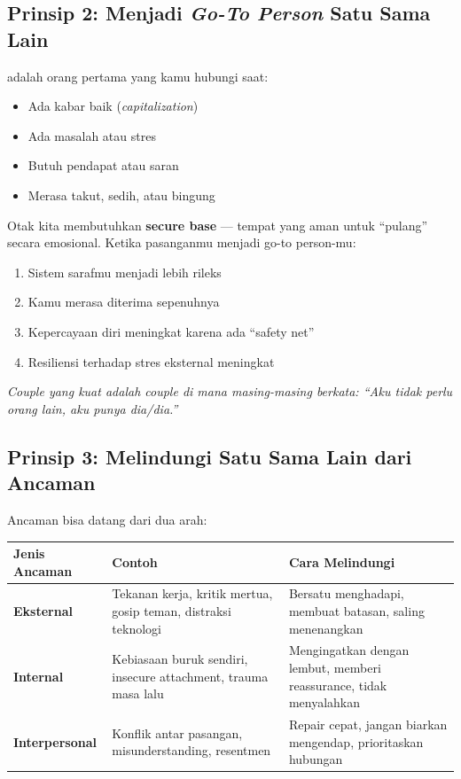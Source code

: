 \subsection{Prinsip 2: Menjadi \textit{Go-To Person} Satu Sama Lain}

 adalah orang pertama yang kamu hubungi saat:
\begin{itemize}
    \item Ada kabar baik (\textit{capitalization})
    \item Ada masalah atau stres
    \item Butuh pendapat atau saran
    \item Merasa takut, sedih, atau bingung
\end{itemize}

\begin{praktikbox}
Otak kita membutuhkan \textbf{secure base} --- tempat yang aman untuk ``pulang'' secara emosional. Ketika pasanganmu menjadi go-to person-mu:
\begin{enumerate}
    \item Sistem sarafmu menjadi lebih rileks
    \item Kamu merasa diterima sepenuhnya
    \item Kepercayaan diri meningkat karena ada ``safety net''
    \item Resiliensi terhadap stres eksternal meningkat
\end{enumerate}

\textit{Couple yang kuat adalah couple di mana masing-masing berkata: ``Aku tidak perlu orang lain, aku punya dia/dia.''}
\end{praktikbox}

\subsection{Prinsip 3: Melindungi Satu Sama Lain dari Ancaman}

Ancaman bisa datang dari dua arah:

\begin{center}
\renewcommand{\arraystretch}{1.6}
\begin{tabular}{|>{\raggedright}p{3cm}|>{\raggedright}p{5.5cm}|>{\raggedright\arraybackslash}p{5.5cm}|}
\hline
\rowcolor{primary!20}
\textbf{Jenis Ancaman} & \textbf{Contoh} & \textbf{Cara Melindungi} \\
\hline
\textbf{Eksternal} & Tekanan kerja, kritik mertua, gosip teman, distraksi teknologi & Bersatu menghadapi, membuat batasan, saling menenangkan \\
\hline
\textbf{Internal} & Kebiasaan buruk sendiri, insecure attachment, trauma masa lalu & Mengingatkan dengan lembut, memberi reassurance, tidak menyalahkan \\
\hline
\textbf{Interpersonal} & Konflik antar pasangan, misunderstanding, resentmen & Repair cepat, jangan biarkan mengendap, prioritaskan hubungan \\
\hline
\end{tabular}
\end{center}

